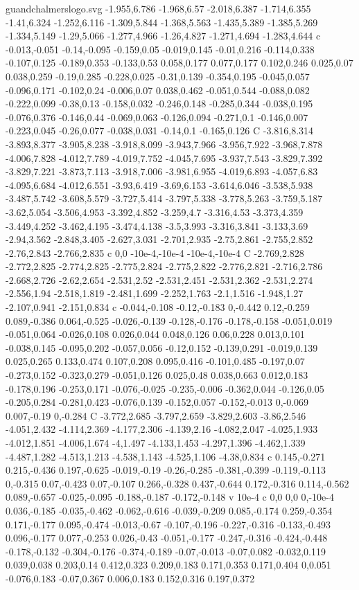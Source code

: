 \begin{filecontents}[noheader]{guandchalmerslogo.svg}
-1.955,6.786 -1.968,6.57 -2.018,6.387 -1.714,6.355 -1.41,6.324 -1.252,6.116 -1.309,5.844 -1.368,5.563 -1.435,5.389 -1.385,5.269 -1.334,5.149 -1.29,5.066 -1.277,4.966 -1.26,4.827 -1.271,4.694 -1.283,4.644 c -0.013,-0.051 -0.14,-0.095 -0.159,0.05 -0.019,0.145 -0.01,0.216 -0.114,0.338 -0.107,0.125 -0.189,0.353 -0.133,0.53 0.058,0.177 0.077,0.177 0.102,0.246 0.025,0.07 0.038,0.259 -0.19,0.285 -0.228,0.025 -0.31,0.139 -0.354,0.195 -0.045,0.057 -0.096,0.171 -0.102,0.24 -0.006,0.07 0.038,0.462 -0.051,0.544 -0.088,0.082 -0.222,0.099 -0.38,0.13 -0.158,0.032 -0.246,0.148 -0.285,0.344 -0.038,0.195 -0.076,0.376 -0.146,0.44 -0.069,0.063 -0.126,0.094 -0.271,0.1 -0.146,0.007 -0.223,0.045 -0.26,0.077 -0.038,0.031 -0.14,0.1 -0.165,0.126 C -3.816,8.314 -3.893,8.377 -3.905,8.238 -3.918,8.099 -3.943,7.966 -3.956,7.922 -3.968,7.878 -4.006,7.828 -4.012,7.789 -4.019,7.752 -4.045,7.695 -3.937,7.543 -3.829,7.392 -3.829,7.221 -3.873,7.113 -3.918,7.006 -3.981,6.955 -4.019,6.893 -4.057,6.83 -4.095,6.684 -4.012,6.551 -3.93,6.419 -3.69,6.153 -3.614,6.046 -3.538,5.938 -3.487,5.742 -3.608,5.579 -3.727,5.414 -3.797,5.338 -3.778,5.263 -3.759,5.187 -3.62,5.054 -3.506,4.953 -3.392,4.852 -3.259,4.7 -3.316,4.53 -3.373,4.359 -3.449,4.252 -3.462,4.195 -3.474,4.138 -3.5,3.993 -3.316,3.841 -3.133,3.69 -2.94,3.562 -2.848,3.405 -2.627,3.031 -2.701,2.935 -2.75,2.861 -2.755,2.852 -2.76,2.843 -2.766,2.835 c 0,0 -10e-4,-10e-4 -10e-4,-10e-4 C -2.769,2.828 -2.772,2.825 -2.774,2.825 -2.775,2.824 -2.775,2.822 -2.776,2.821 -2.716,2.786 -2.668,2.726 -2.62,2.654 -2.531,2.52 -2.531,2.451 -2.531,2.362 -2.531,2.274 -2.556,1.94 -2.518,1.819 -2.481,1.699 -2.252,1.763 -2.1,1.516 -1.948,1.27 -2.107,0.941 -2.151,0.834 c -0.044,-0.108 -0.12,-0.183 0,-0.442 0.12,-0.259 0.089,-0.386 0.064,-0.525 -0.026,-0.139 -0.128,-0.176 -0.178,-0.158 -0.051,0.019 -0.051,0.064 -0.026,0.108 0.026,0.044 0.048,0.126 0.06,0.228 0.013,0.101 -0.038,0.145 -0.095,0.202 -0.057,0.056 -0.12,0.152 -0.139,0.291 -0.019,0.139 0.025,0.265 0.133,0.474 0.107,0.208 0.095,0.416 -0.101,0.485 -0.197,0.07 -0.273,0.152 -0.323,0.279 -0.051,0.126 0.025,0.48 0.038,0.663 0.012,0.183 -0.178,0.196 -0.253,0.171 -0.076,-0.025 -0.235,-0.006 -0.362,0.044 -0.126,0.05 -0.205,0.284 -0.281,0.423 -0.076,0.139 -0.152,0.057 -0.152,-0.013 0,-0.069 0.007,-0.19 0,-0.284 C -3.772,2.685 -3.797,2.659 -3.829,2.603 -3.86,2.546 -4.051,2.432 -4.114,2.369 -4.177,2.306 -4.139,2.16 -4.082,2.047 -4.025,1.933 -4.012,1.851 -4.006,1.674 -4,1.497 -4.133,1.453 -4.297,1.396 -4.462,1.339 -4.487,1.282 -4.513,1.213 -4.538,1.143 -4.525,1.106 -4.38,0.834 c 0.145,-0.271 0.215,-0.436 0.197,-0.625 -0.019,-0.19 -0.26,-0.285 -0.381,-0.399 -0.119,-0.113 0,-0.315 0.07,-0.423 0.07,-0.107 0.266,-0.328 0.437,-0.644 0.172,-0.316 0.114,-0.562 0.089,-0.657 -0.025,-0.095 -0.188,-0.187 -0.172,-0.148 v 10e-4 c 0,0 0,0 0,-10e-4 0.036,-0.185 -0.035,-0.462 -0.062,-0.616 -0.039,-0.209 0.085,-0.174 0.259,-0.354 0.171,-0.177 0.095,-0.474 -0.013,-0.67 -0.107,-0.196 -0.227,-0.316 -0.133,-0.493 0.096,-0.177 0.077,-0.253 0.026,-0.43 -0.051,-0.177 -0.247,-0.316 -0.424,-0.448 -0.178,-0.132 -0.304,-0.176 -0.374,-0.189 -0.07,-0.013 -0.07,0.082 -0.032,0.119 0.039,0.038 0.203,0.14 0.412,0.323 0.209,0.183 0.171,0.353 0.171,0.404 0,0.051 -0.076,0.183 -0.07,0.367 0.006,0.183 0.152,0.316 0.197,0.372 
\end{filecontents}
